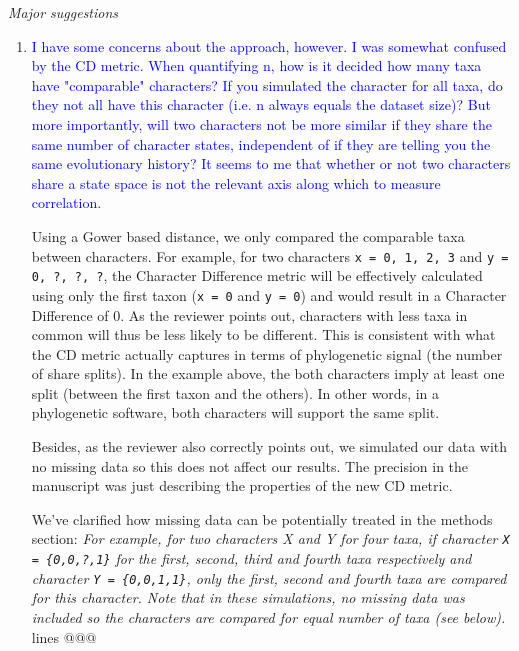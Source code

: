 \documentclass[12pt,letterpaper]{article}
\renewcommand{\subsection}[1]{%
\bigskip
\begin{center}
\begin{large}
\normalfont\itshape #1
\end{large}
\end{center}}
\begin{document}
\subsection{Major suggestions}

\begin{enumerate}

\item{\textcolor{blue}{I have some concerns about the approach, however. I was somewhat confused by the CD metric. When quantifying n, how is it decided how many taxa have "comparable" characters?
If you simulated the character for all taxa, do they not all have this character (i.e. n always equals the dataset size)?
But more importantly, will two characters not be more similar if they share the same number of character states, independent of if they are telling you the same evolutionary history?
It seems to me that whether or not two characters share a state space is not the relevant axis along which to measure correlation.}}
\label{gower}

Using a Gower based distance, we only compared the comparable taxa between characters.
For example, for two characters \texttt{x = {0, 1, 2, 3}} and \texttt{y = {0, ?, ?, ?}}, the Character Difference metric will be effectively calculated using only the first taxon (\texttt{x = {0}} and \texttt{y = {0}}) and would result in a Character Difference of 0.
As the reviewer points out, characters with less taxa in common will thus be less likely to be different.
This is consistent with what the CD metric actually captures in terms of phylogenetic signal (the number of share splits).
In the example above, the both characters imply at least one split (between the first taxon and the others).
In other words, in a phylogenetic software, both characters will support the same split.

Besides, as the reviewer also correctly points out, we simulated our data with no missing data so this does not affect our results.
The precision in the manuscript was just describing the properties of the new CD metric.

We've clarified how missing data can be potentially treated in the methods section:
\textit{For example, for two characters X and Y for four taxa, if character \texttt{X = \{0,0,?,1\}} for the first, second, third and fourth taxa respectively and character \texttt{Y = \{0,0,1,1\}}, only the first, second and fourth taxa are compared for this character.
Note that in these simulations, no missing data was included so the characters are compared for equal number of taxa (see below).} lines @@@


\end{enumerate}
\end{document}
